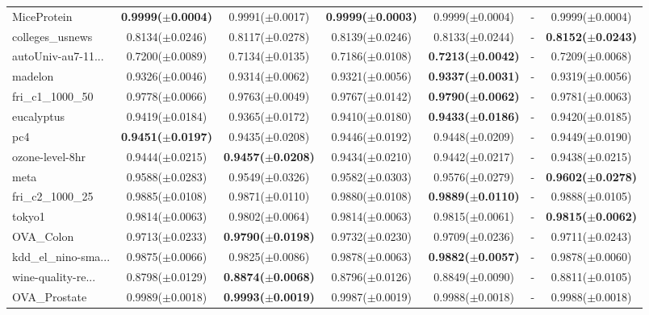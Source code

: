 \begin{longtable}{lcccccc}
MiceProtein & \textbf{0.9999($\pm$0.0004)} & 0.9991($\pm$0.0017) & \textbf{0.9999($\pm$0.0003)} & 0.9999($\pm$0.0004) & - & 0.9999($\pm$0.0004) \\
colleges\_usnews & 0.8134($\pm$0.0246) & 0.8117($\pm$0.0278) & 0.8139($\pm$0.0246) & 0.8133($\pm$0.0244) & - & \textbf{0.8152($\pm$0.0243)} \\
autoUniv-au7-11... & 0.7200($\pm$0.0089) & 0.7134($\pm$0.0135) & 0.7186($\pm$0.0108) & \textbf{0.7213($\pm$0.0042)} & - & 0.7209($\pm$0.0068) \\
madelon & 0.9326($\pm$0.0046) & 0.9314($\pm$0.0062) & 0.9321($\pm$0.0056) & \textbf{0.9337($\pm$0.0031)} & - & 0.9319($\pm$0.0056) \\
fri\_c1\_1000\_50 & 0.9778($\pm$0.0066) & 0.9763($\pm$0.0049) & 0.9767($\pm$0.0142) & \textbf{0.9790($\pm$0.0062)} & - & 0.9781($\pm$0.0063) \\
eucalyptus & 0.9419($\pm$0.0184) & 0.9365($\pm$0.0172) & 0.9410($\pm$0.0180) & \textbf{0.9433($\pm$0.0186)} & - & 0.9420($\pm$0.0185) \\
pc4 & \textbf{0.9451($\pm$0.0197)} & 0.9435($\pm$0.0208) & 0.9446($\pm$0.0192) & 0.9448($\pm$0.0209) & - & 0.9449($\pm$0.0190) \\
ozone-level-8hr & 0.9444($\pm$0.0215) & \textbf{0.9457($\pm$0.0208)} & 0.9434($\pm$0.0210) & 0.9442($\pm$0.0217) & - & 0.9438($\pm$0.0215) \\
meta & 0.9588($\pm$0.0283) & 0.9549($\pm$0.0326) & 0.9582($\pm$0.0303) & 0.9576($\pm$0.0279) & - & \textbf{0.9602($\pm$0.0278)} \\
fri\_c2\_1000\_25 & 0.9885($\pm$0.0108) & 0.9871($\pm$0.0110) & 0.9880($\pm$0.0108) & \textbf{0.9889($\pm$0.0110)} & - & 0.9888($\pm$0.0105) \\
tokyo1 & 0.9814($\pm$0.0063) & 0.9802($\pm$0.0064) & 0.9814($\pm$0.0063) & 0.9815($\pm$0.0061) & - & \textbf{0.9815($\pm$0.0062)} \\
OVA\_Colon & 0.9713($\pm$0.0233) & \textbf{0.9790($\pm$0.0198)} & 0.9732($\pm$0.0230) & 0.9709($\pm$0.0236) & - & 0.9711($\pm$0.0243) \\
kdd\_el\_nino-sma... & 0.9875($\pm$0.0066) & 0.9825($\pm$0.0086) & 0.9878($\pm$0.0063) & \textbf{0.9882($\pm$0.0057)} & - & 0.9878($\pm$0.0060) \\
wine-quality-re... & 0.8798($\pm$0.0129) & \textbf{0.8874($\pm$0.0068)} & 0.8796($\pm$0.0126) & 0.8849($\pm$0.0090) & - & 0.8811($\pm$0.0105) \\
OVA\_Prostate & 0.9989($\pm$0.0018) & \textbf{0.9993($\pm$0.0019)} & 0.9987($\pm$0.0019) & 0.9988($\pm$0.0018) & - & 0.9988($\pm$0.0018) \\

\end{longtable}
